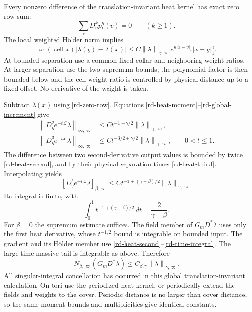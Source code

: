 \documentclass[11pt]{article}
\newcommand{\norm}[1]{\left\lVert#1\right\rVert}
\begin{document}
Every nonzero difference of the translation-invariant heat kernel
has exact zero row sum:
\begin{equation}\label{rd-zero-row}
 \sum_vD_\eta^kp_t^\eta(v)=0\qquad(k\ge1).
\end{equation}
The local weighted H\"older norm implies
\begin{equation}\label{rd-global-increment}
 \varpi(\operatorname{cell}x)|\lambda(y)-\lambda(x)|
 \le C\norm{\lambda}_{\gamma,\varpi}
        e^{\kappa|x-y|_1}|x-y|_1^\gamma.
\end{equation}
At bounded separation use a common fixed collar and neighboring
weight ratios. At larger separation use the two supremum bounds;
the polynomial factor is then bounded below and the cell-weight
ratio is controlled by physical distance up to a fixed offset.
No derivative of the weight is taken.

Subtract $\lambda(x)$ using \eqref{rd-zero-row}. Equations
\eqref{rd-heat-moment}--\eqref{rd-global-increment} give
\begin{align}
 \norm{D_\eta^2e^{-t\mathcal L}\lambda}_{\infty,\varpi}
   &\le Ct^{-1+\gamma/2}\norm{\lambda}_{\gamma,\varpi},
       \label{rd-heat-second}\\
 \norm{D_\eta^3e^{-t\mathcal L}\lambda}_{\infty,\varpi}
   &\le Ct^{-3/2+\gamma/2}\norm{\lambda}_{\gamma,\varpi},
                   \qquad0<t\le1.
       \label{rd-heat-third}
\end{align}
The difference between two second-derivative output values is
bounded by twice \eqref{rd-heat-second}, and by their physical
separation times \eqref{rd-heat-third}. Interpolating yields
\begin{equation}\label{rd-heat-holder}
 [D_\eta^2e^{-t\mathcal L}\lambda]_{\beta,\varpi}
       \le Ct^{-1+(\gamma-\beta)/2}
                                  \norm{\lambda}_{\gamma,\varpi}.
\end{equation}
Its integral is finite, with
\begin{equation}\label{rd-time-integral}
 \int_0^1t^{-1+(\gamma-\beta)/2}\,dt
                      =\frac2{\gamma-\beta}.
\end{equation}
For $\beta=0$ the supremum estimate suffices. The field member of
$G_mD^*\lambda$ uses only the first heat derivative, whose
$t^{-1/2}$ bound is integrable on bounded input. The gradient and
its H\"older member use
\eqref{rd-heat-second}--\eqref{rd-time-integral}. The large-time
massive tail is integrable as above. Therefore
\begin{equation}\label{rd-massive-bound}
 N_{\beta,\varpi}(G_mD^*\lambda)
                  \le C_{\beta,\gamma}
                                  \norm{\lambda}_{\gamma,\varpi}.
\end{equation}
All singular-integral cancellation has occurred in this global
translation-invariant calculation. On tori use the periodized heat
kernel, or periodically extend the fields and weights to the cover.
Periodic distance is no larger than cover distance, so the same
moment bounds and multiplicities give identical constants.
\end{document}
